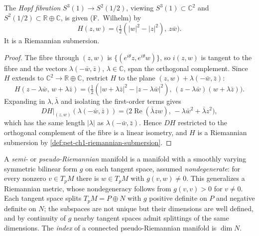 \begin{example}
  \label{ex:pet-ch1-hopf-fibration}
  \leanok
  The \emph{Hopf fibration} $S^3(1)\to S^2(1/2)$, viewing $S^3(1)\subset\mathbb{C}^2$
  and $S^2(1/2)\subset\mathbb{R}\oplus\mathbb{C}$, is given (F.\ Wilhelm) by
  \[
    H(z,w)=\Big(\tfrac12(|w|^2-|z|^2),\,z\bar w\Big).
  \]
  It is a Riemannian submersion.
\end{example}
\begin{proof}
  \leanok
  The fibre through $(z,w)$ is $\{(e^{i\theta}z,e^{i\theta}w)\}$, so $i(z,w)$ is
  tangent to the fibre and the vectors $\lambda(-\bar w,\bar z)$, $\lambda\in\mathbb{C}$,
  span the orthogonal complement. Since $H$ extends to $\mathbb{C}^2\to\mathbb{R}\oplus\mathbb{C}$,
  restrict $H$ to the plane $(z,w)+\lambda(-\bar w,\bar z)$:
  \[
    H(z-\lambda\bar w,\,w+\lambda\bar z)
    =\Big(\tfrac12(|w+\lambda\bar z|^2-|z-\lambda\bar w|^2),\,
    (z-\lambda\bar w)(w+\lambda\bar z)\Big).
  \]
  Expanding in $\lambda,\bar\lambda$ and isolating the first-order terms gives
  \[
    DH|_{(z,w)}(\lambda(-\bar w,\bar z))=\big(2\operatorname{Re}(\bar\lambda zw),\,-\lambda\bar w^2+\bar\lambda z^2\big),
  \]
  which has the same length $|\lambda|$ as $\lambda(-\bar w,\bar z)$. Hence $DH$
  restricted to the orthogonal complement of the fibre is a linear isometry, and
  $H$ is a Riemannian submersion by \cref{def:pet-ch1-riemannian-submersion}.
\end{proof}

\begin{definition}
  \label{def:pet-ch1-pseudo-riemannian}
  \leanok
  A \emph{semi-} or \emph{pseudo-Riemannian} manifold is a manifold with a
  smoothly varying symmetric bilinear form $g$ on each tangent space, assumed
  \emph{nondegenerate}: for every nonzero $v\in T_pM$ there is $w\in T_pM$ with
  $g(v,w)\ne0$. This generalizes a Riemannian metric, whose nondegeneracy follows
  from $g(v,v)>0$ for $v\ne0$. Each tangent space splits $T_pM=P\oplus N$ with $g$
  positive definite on $P$ and negative definite on $N$; the subspaces are not
  unique but their dimensions are well defined, and by continuity of $g$ nearby
  tangent spaces admit splittings of the same dimensions. The \emph{index} of a
  connected pseudo-Riemannian manifold is $\dim N$.
\end{definition}

